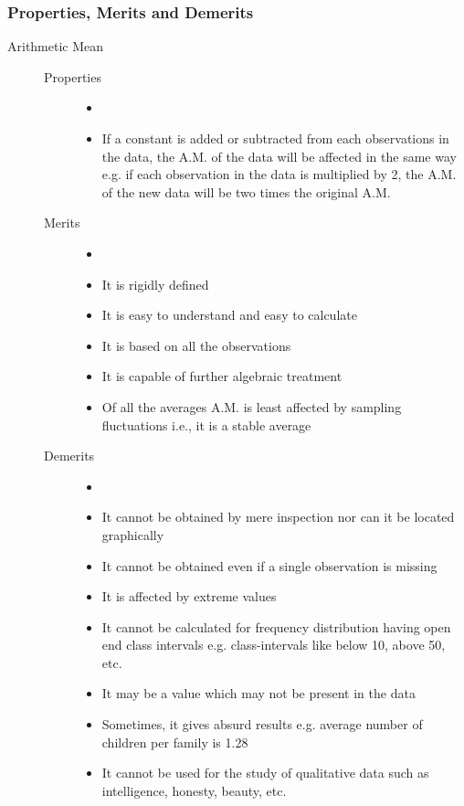 \documentclass[
10pt, %
a4paper, %
]{report}
\begin{document}
\subsubsection*{Properties, Merits and Demerits}
\begin{description}
\item[Arithmetic Mean]
\begin{description}
\item[]
\item[Properties]
\begin{itemize}
\item[]
\item If a constant is added or subtracted from each observations in the data, the A.M. of the data will be affected in the same way e.g. if each observation in the data is multiplied by 2, the A.M. of the new data will be two times the original A.M.
\end{itemize}
\item[Merits]
\begin{itemize}
\item[]
\item It is rigidly defined
\item It is easy to understand and easy to calculate
\item It is based on all the observations
\item It is capable of further algebraic treatment
\item Of all the averages A.M. is least affected by sampling fluctuations i.e., it is a stable average
\end{itemize}
\item[Demerits]
\begin{itemize}
\item[]
\item It cannot be obtained by mere inspection nor can it be located graphically
\item It cannot be obtained even if a single observation is missing
\item It is affected by extreme values
\item It cannot be calculated for frequency distribution having open end class intervals e.g. class-intervals like below 10, above 50, etc.
\item It may be a value which may not be present in the data
\item Sometimes, it gives absurd results e.g. average number of children per family is 1.28
\item It cannot be used for the study of qualitative data such as intelligence, honesty, beauty, etc.

\end{itemize}
\end{description}
\end{description}
\end{document}
